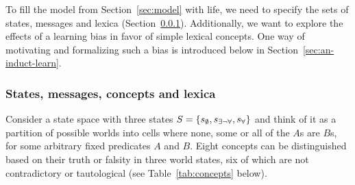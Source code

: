 \documentclass[a4paper, 11pt]{article}
\theoremstyle{Satz}
\newcommand{\set}[1]{\left\{#1\right\}}
\newcommand{\States}{\ensuremath{S}\xspace}		%
\newcommand{\state}{\ensuremath{s}\xspace}		%
\newcommand{\mystate}[1]{\ensuremath{\state_{\text{#1}}}\xspace} %
\newcommand{\ssome}{\mystate{\ensuremath{\exists\neg\forall}}}
\newcommand{\sall}{\mystate{\ensuremath{\forall}}}
\newcommand{\snone}{\mystate{\ensuremath{\emptyset}}}
\begin{document}
To fill the model from Section~\ref{sec:model} with life, we need to specify the sets of
states, messages and lexica (Section~\ref{sec:stat-mess-conc}). Additionally, we want to
explore the effects of a learning bias in favor of simple lexical concepts. One way of
motivating and formalizing such a bias is introduced below in
Section~\ref{sec:an-induct-learn}.


\subsubsection{States, messages, concepts and lexica} 
\label{sec:stat-mess-conc}

Consider a state space with three states $\States = \set{\snone, \ssome, \sall}$ and think of
it as a partition of possible worlds into cells where none, some or all of the $A$s are $B$s,
for some arbitrary fixed predicates $A$ and $B$. Eight concepts can be distinguished based on
their truth or falsity in three world states, six of which are not contradictory or
tautological (see Table~\ref{tab:concepts} below).
\end{document}
